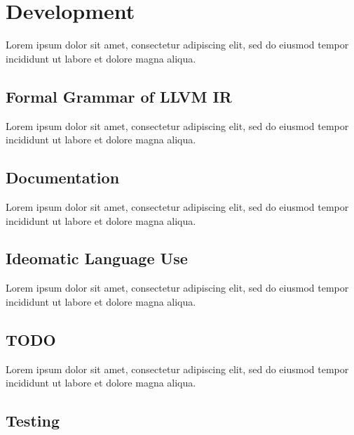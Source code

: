 \documentclass[12pt, a4paper]{article}
\begin{document}
\section{Development}

Lorem ipsum dolor sit amet, consectetur adipiscing elit, sed do eiusmod tempor incididunt ut labore et dolore magna aliqua.


\subsection{Formal Grammar of LLVM IR}

Lorem ipsum dolor sit amet, consectetur adipiscing elit, sed do eiusmod tempor incididunt ut labore et dolore magna aliqua.


\subsection{Documentation}

Lorem ipsum dolor sit amet, consectetur adipiscing elit, sed do eiusmod tempor incididunt ut labore et dolore magna aliqua.


\subsection{Ideomatic Language Use}

Lorem ipsum dolor sit amet, consectetur adipiscing elit, sed do eiusmod tempor incididunt ut labore et dolore magna aliqua.


\subsection{TODO}

Lorem ipsum dolor sit amet, consectetur adipiscing elit, sed do eiusmod tempor incididunt ut labore et dolore magna aliqua.


\subsection{Testing}
\end{document}
